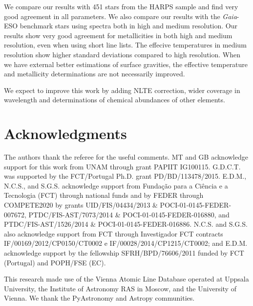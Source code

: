 \documentclass[fleqn,usenatbib]{mnras}
\begin{document}
We compare our results with 451 stars from the HARPS sample and find very good agreement in all parameters. We also compare our results with the \textit{Gaia}-ESO benchmark stars 
using spectra both in high and medium resolution. Our results show very good agreement for metallicities in both high and medium resolution, even when using short line lists. 
The effecive temperatures in medium resolution show higher standard deviations compared to high resolution. When we have external better estimations of surface gravities, 
the effective temperature and metallicity determinations are not necessarily improved. 

We expect to improve this work by adding NLTE correction, wider coverage in wavelength and determinations of chemical abundances of other elements. 

\section*{Acknowledgments}

The authors thank the referee for the useful comments. MT and GB acknowledge support for this work from UNAM through grant PAPIIT IG100115.
G.D.C.T. was supported by the FCT/Portugal Ph.D. grant PD/BD/113478/2015. 
E.D.M., N.C.S., and S.G.S. acknowledge support from Funda\c{c}\~{a}o para a Ci\^{e}ncia e a Tecnologia (FCT) through national funds and by FEDER through COMPETE2020 by grants UID/FIS/04434/2013 \& 
POCI-01-0145-FEDER-007672, PTDC/FIS-AST/7073/2014 \& POCI-01-0145-FEDER-016880, and PTDC/FIS-AST/1526/2014 \& POCI-01-0145-FEDER-016886. N.C.S. and S.G.S. also acknowledge support 
from FCT through Investigador FCT contracts IF/00169/2012/CP0150/CT0002 e IF/00028/2014/CP1215/CT0002; and E.D.M. acknowledge support by the fellowship SFRH/BPD/76606/2011 
funded by FCT (Portugal) and POPH/FSE (EC). 
 
This research made use of the Vienna Atomic Line Database operated at Uppsala University, the Institute of Astronomy RAS in Moscow, and the University of 
Vienna. We thank the PyAstronomy and Astropy communities.
 



\appendix
\clearpage
\newpage
\end{document}
